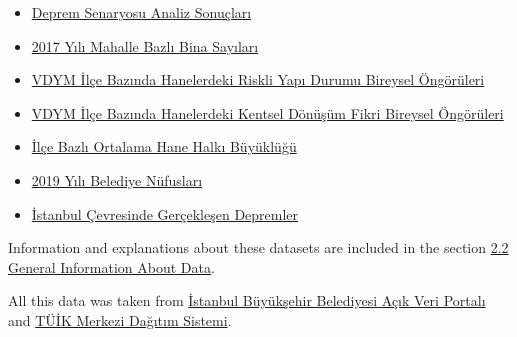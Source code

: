 \documentclass[
  11pt,
  a4paper,
  DIV=11,
  numbers=noendperiod]{scrartcl}
\begin{document}
\begin{itemize}
\item
  \href{https://data.ibb.gov.tr/dataset/deprem-senaryosu-analiz-sonuclari/resource/9c3ac492-de4b-4245-b418-7ad3df67a193}{Deprem
  Senaryosu Analiz Sonuçları}
\item
  \href{https://data.ibb.gov.tr/dataset/mahalle-bazli-bina-analiz-verisi/resource/cef193d5-0bd2-4e8d-8a69-275c50288875}{2017
  Yılı Mahalle Bazlı Bina Sayıları}
\item
  \href{https://data.ibb.gov.tr/dataset/vdym-ilce-bazinda-hanelerdeki-riskli-yapi-durumu-bireysel-ongoruleri/resource/52fe7088-62f2-4480-8f27-788dee385c9b}{VDYM
  İlçe Bazında Hanelerdeki Riskli Yapı Durumu Bireysel Öngörüleri}
\item
  \href{https://data.ibb.gov.tr/dataset/vdym-ilce-bazinda-hanelerdeki-kentsel-donusum-fikri-bireysel-ongoruleri/resource/2683ee8b-9bc3-45cf-a115-49b285851317}{VDYM
  İlçe Bazında Hanelerdeki Kentsel Dönüşüm Fikri Bireysel Öngörüleri}
\item
  \href{https://data.ibb.gov.tr/dataset/ilce-bazli-ortalama-hane-halki-buyuklugu/resource/da747beb-df41-474e-aa8a-93d983e69b15}{İlçe
  Bazlı Ortalama Hane Halkı Büyüklüğü}
\item
  \href{https://data.ibb.gov.tr/dataset/belediye-nufuslari-veri-seti/resource/c6c9b289-2824-41b3-ab3d-4fd655ed4e24}{2019
  Yılı Belediye Nüfusları}
\item
  \href{https://data.ibb.gov.tr/dataset/istanbul-da-son-bir-yilda-gerceklesen-depremler/resource/32904f60-8091-4dc3-b527-351dca6c1c22}{İstanbul
  Çevresinde Gerçekleşen Depremler}
\end{itemize}

Information and explanations about these datasets are included in the
section \protect\hyperlink{general-information-about-data}{2.2 General
Information About Data}.

All this data was taken from
\href{https://data.ibb.gov.tr/dataset}{İstanbul Büyükşehir Belediyesi
Açık Veri Portalı} and \href{https://biruni.tuik.gov.tr/medas/}{TÜİK
Merkezi Dağıtım Sistemi}.
\end{document}
